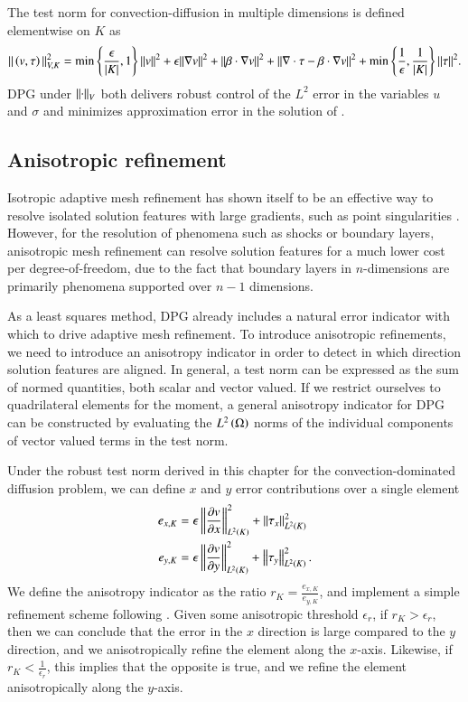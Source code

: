 The test norm for convection-diffusion in multiple dimensions is defined elementwise on $K$ as
\[
\|\left(v,\tau\right)\|_{V,K}^2 = \min\left\{\frac{\epsilon}{|K|},1\right\}\|v\|^2 + \epsilon \|\grad v\|^2 + \|\beta \cdot \grad v\|^2 + \| \div \tau-\beta\cdot\grad v\|^2 + \min\left\{\frac{1}{\epsilon},\frac{1}{|K|}\right\}\|\tau\|^2.
\]
DPG under $\nor{\cdot}_V$ both delivers robust control of the $L^2$ error in the variables $u$ and $\sigma$ and minimizes approximation error in the solution of .

\subsection{Anisotropic refinement}
Isotropic adaptive mesh refinement has shown itself to be an effective way to resolve isolated solution features with large gradients, such as point singularities \cite{hp1,hp3}. However, for the resolution of phenomena such as shocks or boundary layers, anisotropic mesh refinement can resolve solution features for a much lower cost per degree-of-freedom, due to the fact that boundary layers in $n$-dimensions are primarily phenomena supported over $n-1$ dimensions.  

As a least squares method, DPG already includes a natural error indicator with which to drive adaptive mesh refinement.  To introduce anisotropic refinements, we need to introduce an anisotropy indicator in order to detect in which direction solution features are aligned.  In general, a test norm can be expressed as the sum of normed quantities, both scalar and vector valued.  If we restrict ourselves to quadrilateral elements for the moment, a general anisotropy indicator for DPG can be constructed by evaluating the $\L$ norms of the individual components of vector valued terms in the test norm.  

Under the robust test norm derived in this chapter for the convection-dominated diffusion problem, we can define $x$ and $y$ error contributions over a single element
\begin{align*}
e_{x,K} &= \epsilon \nor{\pd{v}{x}}_{L^2(K)}^2 + \nor{\tau_x}_{L^2(K)}^2 \\
e_{y,K} &= \epsilon \nor{\pd{v}{y}}_{L^2(K)}^2 + \nor{\tau_y}_{L^2(K)}^2.
\end{align*}
We define the anisotropy indicator as the ratio $r_K = \frac{e_{x,K}}{e_{y,K}}$, and implement a simple refinement scheme following \cite{DPG3}.  Given some anisotropic threshold $\epsilon_r$, if $r_K>\epsilon_r$, then we can conclude that the error in the $x$ direction is large compared to the $y$ direction, and we anisotropically refine the element along the $x$-axis.  Likewise, if $r_K < \frac{1}{\epsilon_r}$, this implies that the opposite is true, and we refine the element anisotropically along the $y$-axis.  


